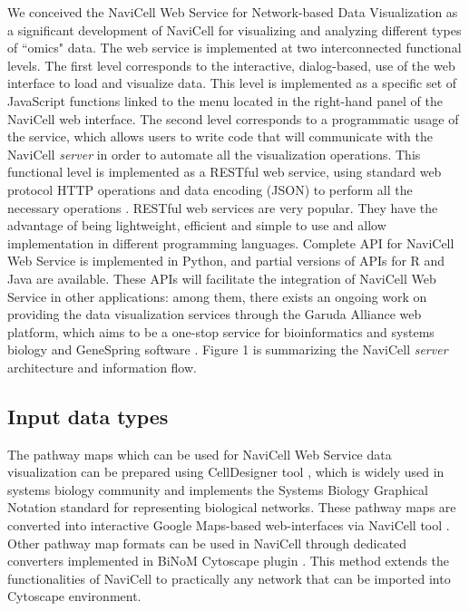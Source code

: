 \documentclass[a4,center,fleqn]{NAR}
\begin{document}
We conceived the NaviCell Web Service for Network-based Data Visualization
as a significant development of NaviCell \cite{kuperstein2013navicell}
for visualizing and analyzing different types of ``omics" data. The web service
is implemented at two interconnected functional levels.
The first level corresponds to the interactive, dialog-based,
use of the web interface to load and visualize data. This level is implemented
as a specific set of JavaScript functions linked to the menu located
in the right-hand panel of the NaviCell web interface. The second level corresponds to a
programmatic usage of the service, which allows users to write code that will
communicate with the NaviCell \emph{server} in order to automate all the
visualization operations. This functional level is implemented as a RESTful web
service, using standard web protocol HTTP operations and data encoding (JSON)
to perform all the necessary operations \cite{fielding2002principled}.
RESTful web services are very popular. They have the advantage of being
lightweight, efficient and simple to use and allow implementation in different programming languages. 
Complete API for NaviCell Web Service is implemented in Python, and
partial versions of APIs for R and Java are available. These APIs will facilitate the integration
of NaviCell Web Service in other applications: among them, there exists an
ongoing work on providing the data visualization services through the Garuda
Alliance web platform, which aims to be a one-stop service for bioinformatics
and systems biology \cite{ghosh2011software} and GeneSpring software
\cite{Chu2001}. Figure 1 is summarizing the NaviCell \emph{server} architecture
and information flow.

\subsection{Input data types}

The pathway maps which can be used for NaviCell Web Service data visualization
can be prepared using CellDesigner tool \cite{Funahashi2008}, which is widely
used in systems biology community and implements the Systems Biology Graphical
Notation standard \cite{LeNovere2009} for representing biological networks.
These pathway maps are converted into interactive Google Maps-based
web-interfaces via NaviCell tool \cite{kuperstein2013navicell}.  Other pathway
map formats can be used in NaviCell through dedicated converters implemented in
BiNoM Cytoscape plugin \cite{Zinovyev2008,Bonnet2013a}.  This method extends
the functionalities of NaviCell to practically any network that can be imported
into Cytoscape environment.
\end{document}
